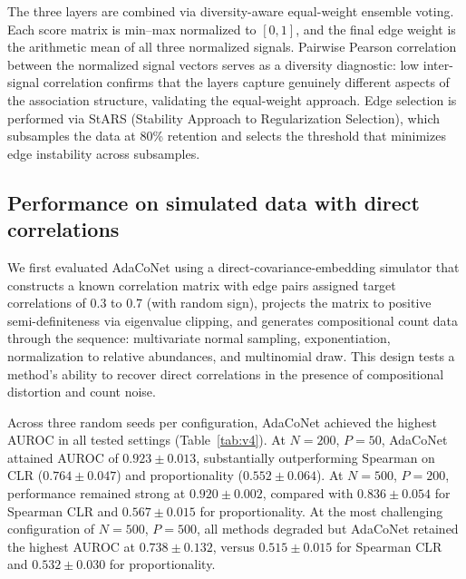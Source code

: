 \documentclass[fleqn]{nature}
\begin{document}
The three layers are combined via diversity-aware equal-weight ensemble voting.
Each score matrix is min--max normalized to $[0,1]$, and the final edge weight is the arithmetic mean of all three normalized signals.
Pairwise Pearson correlation between the normalized signal vectors serves as a diversity diagnostic: low inter-signal correlation confirms that the layers capture genuinely different aspects of the association structure, validating the equal-weight approach.
Edge selection is performed via StARS (Stability Approach to Regularization Selection)\cite{liu2010}, which subsamples the data at 80\% retention and selects the threshold that minimizes edge instability across subsamples.


\subsection*{Performance on simulated data with direct correlations}

We first evaluated AdaCoNet using a direct-covariance-embedding simulator that constructs a known correlation matrix with edge pairs assigned target correlations of 0.3 to 0.7 (with random sign), projects the matrix to positive semi-definiteness via eigenvalue clipping, and generates compositional count data through the sequence: multivariate normal sampling, exponentiation, normalization to relative abundances, and multinomial draw.
This design tests a method's ability to recover direct correlations in the presence of compositional distortion and count noise.

Across three random seeds per configuration, AdaCoNet achieved the highest AUROC in all tested settings (Table~\ref{tab:v4}).
At $N = 200$, $P = 50$, AdaCoNet attained AUROC of $0.923 \pm 0.013$, substantially outperforming Spearman on CLR ($0.764 \pm 0.047$) and proportionality ($0.552 \pm 0.064$).
At $N = 500$, $P = 200$, performance remained strong at $0.920 \pm 0.002$, compared with $0.836 \pm 0.054$ for Spearman CLR and $0.567 \pm 0.015$ for proportionality.
At the most challenging configuration of $N = 500$, $P = 500$, all methods degraded but AdaCoNet retained the highest AUROC at $0.738 \pm 0.132$, versus $0.515 \pm 0.015$ for Spearman CLR and $0.532 \pm 0.030$ for proportionality.
\end{document}
